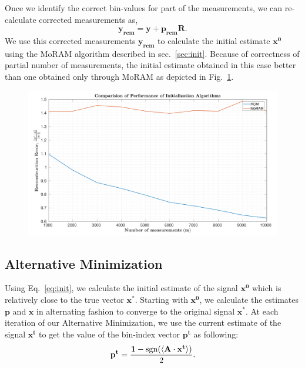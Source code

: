 Once we identify the correct bin-values for part of the measurements, we can re-calculate corrected measurements as,
$$
\mathbf{y_{rcm} = y + p_{rcm}R}.
$$
We use this corrected measurements $\mathbf{y_{rcm}}$ to calculate the initial estimate $\mathbf{{x}^0}$ using the MoRAM algorithm described in sec.~\ref{sec:init}. Because of correctness of partial number of measurements, the initial estimate obtained in this case better than one obtained only through MoRAM as depicted in Fig.~\ref{fig:init_comp}.

 \begin{figure}[h]
 	\begin{center}
 		\includegraphics[width=\linewidth]{./fig/MoRAM_RCM_compare.pdf}
 	\end{center}
 	\caption{}
 	\label{fig:init_comp}
 \end{figure}

\subsection{Alternative Minimization}
\label{sec:altmin}

Using Eq.~\ref{eq:init}, we calculate the initial estimate of the signal $\mathbf{{x}^0}$ which is relatively close to the true vector $\mathbf{x^*}$. Starting with $\mathbf{{x}^0}$, we  calculate the estimates $\mathbf{p}$ and $\mathbf{x}$ in alternating fashion to converge to the original signal $\mathbf{x^*}$. At each iteration of our Alternative Minimization, we use the current estimate of the signal ${\mathbf{x^t}}$ to get the value of the bin-index vector $\mathbf{{p}^t}$ as following:
\begin{equation}
\mathbf{{p}^{t}} = \frac{\mathbf{1}-\mathrm{sgn}(\langle \mathbf{A} \cdot \mathbf{x^t} \rangle)}{2}.
\label{step1}
\end{equation}

